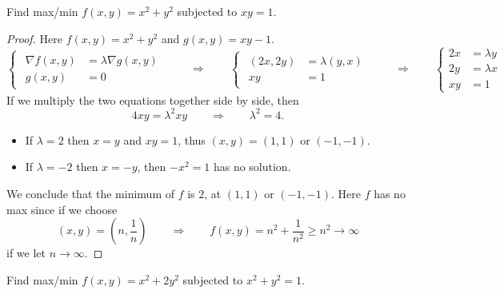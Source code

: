 \begin{example} Find max/min $f(x,y) = x^2+y^2$ subjected to $xy=1$. 
\end{example}
\begin{proof} Here $f(x,y) = x^2+y^2$ and $g(x,y) = xy-1$. 
\begin{equation*}
    \begin{cases}
        \begin{aligned}
            \nabla f(x,y) &= \lambda \nabla g(x,y)\\
            g(x,y) &= 0
        \end{aligned}
    \end{cases} \qquad\Longrightarrow\qquad 
    \begin{cases}
        \begin{aligned}
            (2x, 2y) &= \lambda(y,x)\\
            xy&=1
        \end{aligned}
    \end{cases} \qquad\Longrightarrow\qquad \begin{cases}
        2x&=\lambda y\\
        2y&=\lambda x\\
        xy &= 1
    \end{cases}
\end{equation*}
If we multiply the two equations together side by side, then
\begin{equation*}
    4xy = \lambda^2 xy \qquad\Longrightarrow\qquad \lambda^2 = 4.
\end{equation*}
\begin{itemize}
    \item If $\lambda=2$ then $x=y$ and $xy=1$, thus $(x,y)=(1,1)$ or $(-1,-1)$.
    \item If $\lambda=-2$ then $x=-y$, then $-x^2=1$ has no solution.
\end{itemize}
We conclude that the minimum of $f$ is $2$, at $(1,1)$ or $(-1,-1)$. Here $f$ has no max since if we choose 
\begin{equation*}
    (x,y) = \left(n,\frac{1}{n}\right) \qquad\Longrightarrow\qquad f(x,y) = n^2+\frac{1}{n^2} \geq n^2 \to \infty
\end{equation*}
if we let $n\to \infty$.
\end{proof}

\begin{example}  Find max/min $f(x,y) = x^2+2y^2$ subjected to $x^2+y^2=1$. 
\end{example}

